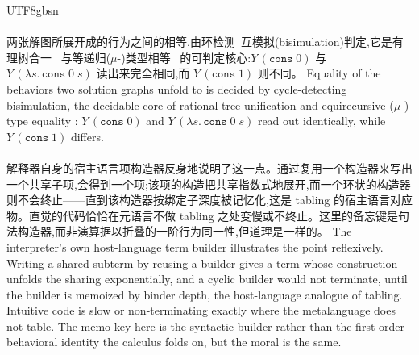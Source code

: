 \begin{CJK*}{UTF8}{gbsn}
  \paragraph{}
  \ifTablambdaChinese
  两张解图所展开成的行为之间的相等,由环检测~\cite{courcelle1983-infinite-trees}互模拟(bisimulation)判定,它是有理树合一~\cite{colmerauer1984-trees} 与等递归($\mu$-)类型相等~\cite{amadio1993-subtyping-recursive-types, brandt1998-coinductive-type-equality} 的可判定核心:$Y\,(\mathtt{cons}\;0)$ 与 $Y\,(\lambda s.\,\mathtt{cons}\;0\;s)$ 读出来完全相同,而 $Y\,(\mathtt{cons}\;1)$ 则不同。
  \else
  Equality of the behaviors two solution graphs unfold to is decided by cycle-detecting~\cite{courcelle1983-infinite-trees} bisimulation, the decidable core of rational-tree unification \cite{colmerauer1984-trees} and equirecursive ($\mu$-) type equality \cite{amadio1993-subtyping-recursive-types, brandt1998-coinductive-type-equality}: $Y\,(\mathtt{cons}\;0)$ and $Y\,(\lambda s.\,\mathtt{cons}\;0\;s)$ read out identically, while $Y\,(\mathtt{cons}\;1)$ differs.
  \fi

  \paragraph{}
  \ifTablambdaChinese
  解释器自身的宿主语言项构造器反身地说明了这一点。通过复用一个构造器来写出一个共享子项,会得到一个项;该项的构造把共享指数式地展开,而一个环状的构造器则不会终止——直到该构造器按绑定子深度被记忆化,这是 tabling 的宿主语言对应物。直觉的代码恰恰在元语言不做 tabling 之处变慢或不终止。这里的备忘键是句法构造器,而非演算据以折叠的一阶行为同一性,但道理是一样的。
  \else
  The interpreter's own host-language term builder illustrates the point reflexively. Writing a shared subterm by reusing a builder gives a term whose construction unfolds the sharing exponentially, and a cyclic builder would not terminate, until the builder is memoized by binder depth, the host-language analogue of tabling. Intuitive code is slow or non-terminating exactly where the metalanguage does not table. The memo key here is the syntactic builder rather than the first-order behavioral identity the calculus folds on, but the moral is the same.
  \fi


\end{CJK*}
